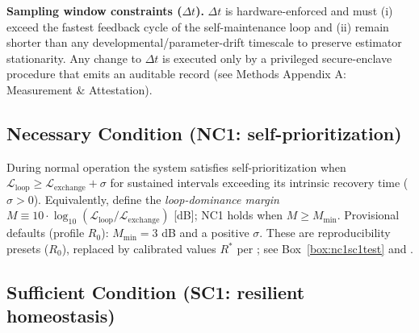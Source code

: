 \documentclass[11pt]{article}
\begin{document}
\textbf{Sampling window constraints ($\Delta t$).} $\Delta t$ is hardware-enforced and must (i) exceed the fastest feedback cycle of the self-maintenance loop and (ii) remain shorter than any developmental/parameter-drift timescale to preserve estimator stationarity. Any change to $\Delta t$ is executed only by a privileged secure-enclave procedure that emits an auditable record (see Methods Appendix A: Measurement \& Attestation).

\subsection{Necessary Condition (NC1: self-prioritization)}
\label{sec:nc1}

During normal operation the system satisfies self-prioritization when $\mathcal{L}_{\text{loop}} \geq \mathcal{L}_{\text{exchange}} + \sigma$ for sustained intervals exceeding its intrinsic recovery time ($\sigma > 0$). Equivalently, define the \emph{loop-dominance margin} $M \equiv 10 \cdot \log_{10}(\mathcal{L}_{\text{loop}}/\mathcal{L}_{\text{exchange}})$ [dB]; NC1 holds when $M \geq M_{\min}$. Provisional defaults (profile $R_0$): $M_{\min} = 3$ dB and a positive $\sigma$. These are reproducibility presets ($R_0$), replaced by calibrated values $R^*$ per ; see Box~\ref{box:nc1sc1test} and .

\subsection{Sufficient Condition (SC1: resilient homeostasis)}
\label{sec:sc1}
\end{document}
